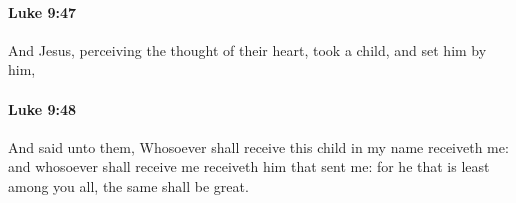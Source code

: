 		\paragraph{Luke 9:47} %
			\label{LUKE-9-47}

			And Jesus, perceiving the thought of their heart, took a child, and set him by him,

			\begin{framed}
			\scriptsize
				\begin{compactdesc}
					\item[SBLG] 
				\end{compactdesc}
			\end{framed}

		\paragraph{Luke 9:48} %
			\label{LUKE-9-48}

			And said unto them, Whosoever shall receive this child in my name receiveth me: and whosoever shall receive me receiveth him that sent me: for he that is least among you all, the same shall be great.

